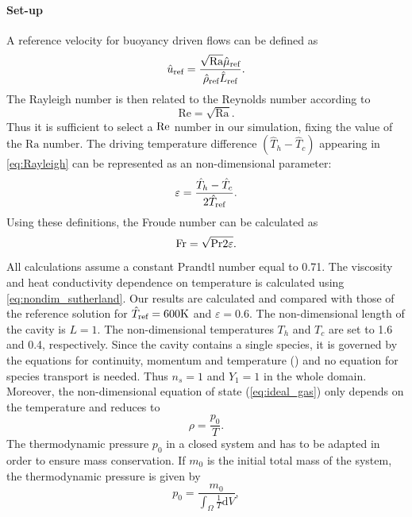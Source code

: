 {\paragraph{Set-up}
A reference velocity for buoyancy driven flows can be defined as\cite{vierendeelsBenchmarkSolutionsNatural2003}
\begin{equation}
\RefVal{u} = \frac{\sqrt{\text{Ra}} \RefVal{\mu}}{\RefVal{\rho}\RefVal{L}}.
\end{equation} 
The Rayleigh number is then related to the Reynolds number according to
\begin{equation}
\text{Re} = \sqrt{\text{Ra}}.
\end{equation}
Thus it is sufficient to select a $\Reynolds$ number in our simulation, fixing the value of the $\text{Ra}$ number. The driving temperature difference $(\hat T_h - \hat T_c)$ appearing in \cref{eq:Rayleigh} can be represented as an non-dimensional parameter:
\begin{equation}\label{eq:nondimensionalTemperature}
\varepsilon = \frac{\hat T_h - \hat T_c}{2\RefVal{T}}.
\end{equation}
Using these definitions, the Froude number can be calculated as 
\begin{equation}
\Froude = \sqrt{\Prandtl 2 \varepsilon}.
\end{equation}
All calculations assume a constant Prandtl number equal to 0.71. The viscosity and heat conductivity  dependence on temperature is calculated using \cref{eq:nondim_sutherland}.
Our results are calculated and compared with those of the reference solution for $\RefVal{T} = 600\si{K}$  and $\varepsilon = 0.6$. The non-dimensional length of the cavity is $L=1$. The non-dimensional temperatures $T_h$ and $T_c$ are set to 1.6 and 0.4, respectively. 
Since the cavity contains a single species, it is governed by the equations for continuity, momentum and temperature () and no equation for species transport is needed. Thus $n_s = 1$ and  $Y_1 = 1$ in the whole domain.  Moreover, the non-dimensional equation of state (\cref{eq:ideal_gas}) only depends on the temperature and reduces to
\begin{equation}
\rho = \frac{p_0}{T}.
\end{equation}
The thermodynamic pressure $p_0$ in a closed system and has to be adapted in order to ensure mass conservation. If $m_0$ is the initial total mass of the system, the thermodynamic pressure is given by
\begin{equation}
p_0 = \frac{m_0}{\int_\Omega \frac{1}{T}\text{d}V}, \label{eq:p0Condition}

\end{equation}}
